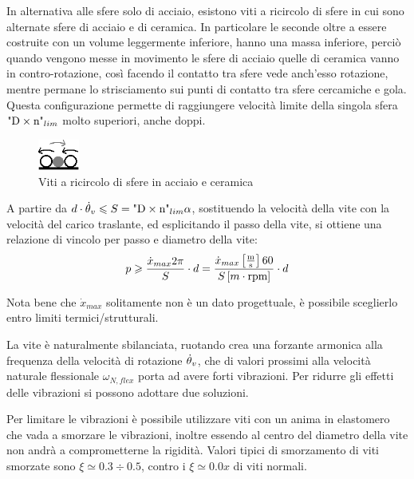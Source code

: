 In alternativa alle sfere solo di acciaio, esistono viti a ricircolo di sfere in cui sono alternate sfere di acciaio e di ceramica. In particolare le seconde oltre a essere costruite con un volume leggermente inferiore, hanno una massa inferiore, perciò quando vengono messe in movimento le sfere di acciaio quelle di ceramica vanno in contro-rotazione, così facendo il contatto tra sfere vede anch'esso rotazione, mentre permane lo strisciamento sui punti di contatto tra sfere cercamiche e gola. Questa configurazione permette di raggiungere velocità limite della singola sfera \( \text{"D}\times \text{n"}_{lim} \) molto superiori, anche doppi.

\begin{figure}[h]
    \centering
    \includegraphics[width=0.12\textwidth]{Immagini/Viti_A_C.png}
    \caption{Viti a ricircolo di sfere in acciaio e ceramica}
\end{figure}

A partire da \( d\cdot \dot{\theta}_v \leqslant S = \text{"D}\times \text{n"}_{lim} \alpha \), sostituendo la velocità della vite con la velocità del carico traslante, ed esplicitando il passo della vite, si ottiene una relazione di vincolo per passo e diametro della vite:
\[ p \geqslant \frac{\dot{x}_{max} 2\pi }{S} \cdot d = \frac{\dot{x}_{max} \left[\frac{\text{m}}{\text{s}}\right] 60 }{S \left[ m \cdot \text{rpm} \right] } \cdot d \]

Nota bene che \(\dot{x}_{max}\) solitamente non è un dato progettuale, è possibile sceglierlo entro limiti termici/strutturali.

La vite è naturalmente sbilanciata, ruotando crea una forzante armonica alla frequenza della velocità di rotazione \( \dot{\theta}_v \), che di valori prossimi alla velocità naturale flessionale \(\omega_{N,flex}\) porta ad avere forti vibrazioni.
Per ridurre gli effetti delle vibrazioni si possono adottare due soluzioni.

Per limitare le vibrazioni è possibile utilizzare viti con un anima in elastomero che vada a smorzare le vibrazioni, inoltre essendo al centro del diametro della vite non andrà a comprometterne la rigidità. Valori tipici di smorzamento di viti smorzate sono \(\xi \simeq 0.3 \div 0.5\), contro i \(\xi \simeq 0.0x \) di viti normali.

